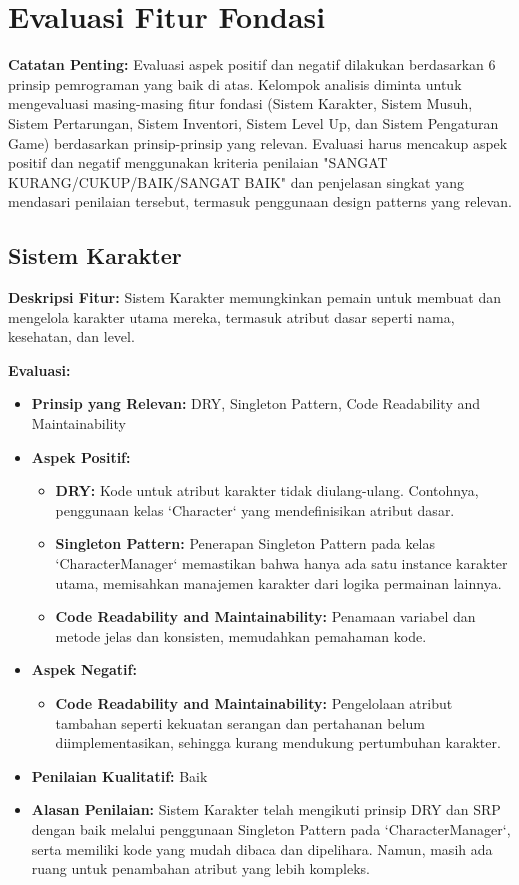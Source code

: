 \documentclass[12pt]{article}
\begin{document}
\section{Evaluasi Fitur Fondasi}
\textbf{Catatan Penting:} Evaluasi aspek positif dan negatif dilakukan berdasarkan 6 prinsip pemrograman yang baik di atas. Kelompok analisis diminta untuk mengevaluasi masing-masing fitur fondasi (Sistem Karakter, Sistem Musuh, Sistem Pertarungan, Sistem Inventori, Sistem Level Up, dan Sistem Pengaturan Game) berdasarkan prinsip-prinsip yang relevan. Evaluasi harus mencakup aspek positif dan negatif menggunakan kriteria penilaian "SANGAT KURANG/CUKUP/BAIK/SANGAT BAIK" dan penjelasan singkat yang mendasari penilaian tersebut, termasuk penggunaan design patterns yang relevan.

\subsection{Sistem Karakter}
\textbf{Deskripsi Fitur:} Sistem Karakter memungkinkan pemain untuk membuat dan mengelola karakter utama mereka, termasuk atribut dasar seperti nama, kesehatan, dan level.

\textbf{Evaluasi:}
\begin{itemize}
    \item \textbf{Prinsip yang Relevan:} DRY, Singleton Pattern, Code Readability and Maintainability
    \item \textbf{Aspek Positif:}
    \begin{itemize}
        \item \textbf{DRY:} Kode untuk atribut karakter tidak diulang-ulang. Contohnya, penggunaan kelas `Character` yang mendefinisikan atribut dasar.
        \item \textbf{Singleton Pattern:} Penerapan Singleton Pattern pada kelas `CharacterManager` memastikan bahwa hanya ada satu instance karakter utama, memisahkan manajemen karakter dari logika permainan lainnya.
        \item \textbf{Code Readability and Maintainability:} Penamaan variabel dan metode jelas dan konsisten, memudahkan pemahaman kode.
    \end{itemize}
    \item \textbf{Aspek Negatif:}
    \begin{itemize}
        \item \textbf{Code Readability and Maintainability:} Pengelolaan atribut tambahan seperti kekuatan serangan dan pertahanan belum diimplementasikan, sehingga kurang mendukung pertumbuhan karakter.
    \end{itemize}
    \item \textbf{Penilaian Kualitatif:} Baik
    \item \textbf{Alasan Penilaian:} Sistem Karakter telah mengikuti prinsip DRY dan SRP dengan baik melalui penggunaan Singleton Pattern pada `CharacterManager`, serta memiliki kode yang mudah dibaca dan dipelihara. Namun, masih ada ruang untuk penambahan atribut yang lebih kompleks.
\end{itemize}
\end{document}
